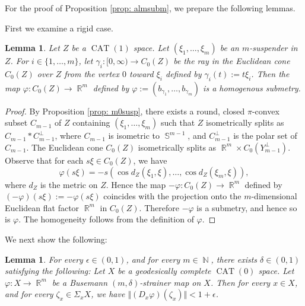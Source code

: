 \documentclass[a4paper,12pt]{amsart}
\newcommand{\CAT}{\operatorname{CAT}}
\newcommand{\R}{\operatorname{\mathbb{R}}}
\newcommand{\N}{\operatorname{\mathbb{N}}}
\newcommand{\Sph}{\operatorname{\mathbb{S}}}
\numberwithin{equation}{section}
\theoremstyle{plain}
\newtheorem{lem}[thm]{Lemma}
\theoremstyle{definition}
\theoremstyle{remark}
\begin{document}
For the proof of Proposition \ref{prop: almsubm},
we prepare the following lemmas.

First we examine a rigid case.

\begin{lem}\label{lem: busemann}
Let $Z$ be a $\CAT(1)$ space.
Let $(\xi_1,\dots,\xi_m)$ be an $m$-suspender in $Z$.
For $i \in \{ 1, \dots, m \}$,
let $\gamma_i \colon [0,\infty) \to C_0(Z)$ be the ray in 
the Euclidean cone $C_0(Z)$ over $Z$
from the vertex $0$ toward $\xi_i$ 
defined by $\gamma_i(t) := t\xi_i$.
Then the map $\varphi \colon C_0(Z) \to \R^m$
defined by $\varphi := \left( b_{\gamma_1}, \dots, b_{\gamma_m} \right)$
is a homogenous submetry.
\end{lem}

\begin{proof}
By Proposition \ref{prop: m0susp},
there exists a round, closed $\pi$-convex subset $C_{m-1}$
of $Z$
containing $(\xi_1,\dots,\xi_m)$
such that $Z$ isometrically splits as 
$C_{m-1} \ast C_{m-1}^{\perp}$,
where
$C_{m-1}$ is isometric to $\Sph^{m-1}$,
and 
$C_{m-1}^{\perp}$ is the polar set of $C_{m-1}$.
The Euclidean cone $C_0(Z)$ isometrically splits as 
$\R^m \times C_0 \left( Y_{m-1}^{\perp} \right)$.
Observe that for each $s\xi \in C_0(Z)$, we have
\[
\varphi(s\xi) = 
-s 
\left( \cos d_Z(\xi_1, \xi), \dots, \cos d_Z(\xi_m, \xi) \right),
\]
where $d_Z$ is the metric on $Z$.
Hence the map
$-\varphi \colon C_0(Z) \to \R^m$
defined by $(-\varphi)(s\xi) := -\varphi(s\xi)$
coincides with 
the projection onto the $m$-dimensional Euclidean flat factor 
$\R^m$ in $C_0(Z)$.
Therefore $-\varphi$ is a submetry,
and hence so is $\varphi$.
The homogeneity follows from the definition of $\varphi$. 
\end{proof}

We next show the following:

\begin{lem}\label{lem: almuspd} 
For every $\epsilon \in (0,1)$, and for every $m \in \N$,
there exists $\delta \in (0,1)$ satisfying the following:
Let $X$ be a geodesically complete $\CAT(0)$ space.
Let $\varphi \colon X \to \R^m$
be a Busemann $(m,\delta)$-strainer map on $X$.
Then for every $x \in X$, and for every $\zeta_x \in \Sigma_xX$,
we have
$\Vert \left( D_x\varphi \right) \left( \zeta_x \right) \Vert < 1+\epsilon$.
\end{lem}
\end{document}
